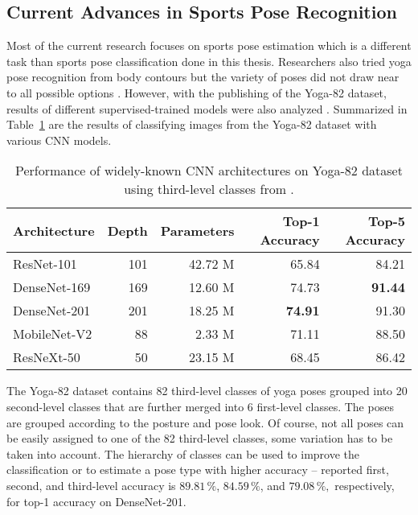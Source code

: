 \subsection{Current Advances in Sports Pose Recognition}

Most of the current research focuses on sports pose estimation which is a different task than sports pose classification done in this thesis. Researchers also tried yoga pose recognition from body contours but the variety of poses did not draw near to all possible options \cite{yoga-posture-recognition}. However, with the publishing of the Yoga-82 dataset, results of different supervised-trained models were also analyzed \cite{verma2020yoga}. Summarized in Table~\ref{tab:yoga82-results} are the results of classifying images from the Yoga-82 dataset with various CNN models.

\begin{table}[ht]
    \centering
    \begin{tabular}{l r r r r}
        \hline
        Architecture & Depth & Parameters & Top-1 Accuracy & Top-5 Accuracy \\
        \hline
        ResNet-101 & 101 & 42.72 M & 65.84 & 84.21 \\
        DenseNet-169 & 169 & 12.60 M & 74.73 & \textbf{91.44} \\
        DenseNet-201 & 201 & 18.25 M & \textbf{74.91} & 91.30 \\
        MobileNet-V2 & 88 & 2.33 M & 71.11 & 88.50 \\
        ResNeXt-50 & 50 & 23.15 M & 68.45 & 86.42 \\
        \hline
    \end{tabular}
    \caption{Performance of widely-known CNN architectures on Yoga-82 dataset using third-level classes from \cite{verma2020yoga}.}
    \label{tab:yoga82-results}
\end{table}

The Yoga-82 dataset contains 82 third-level classes of yoga poses grouped into 20 second-level classes that are further merged into 6 first-level classes. The poses are grouped according to the posture and pose look. Of course, not all poses can be easily assigned to one of the 82 third-level classes, some variation has to be taken into account. The hierarchy of classes can be used to improve the classification or to estimate a pose type with higher accuracy -- reported first, second, and third-level accuracy is $89.81\,\%$, $84.59\,\%$, and $79.08\,\%,$ respectively, for top-1 accuracy on DenseNet-201.

